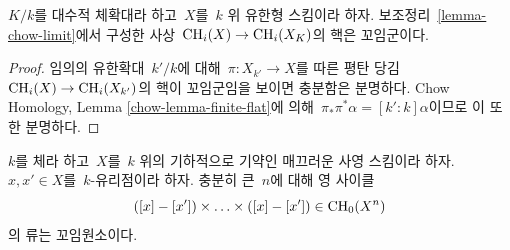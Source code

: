 \begin{lemma}
\label{lemma-kernel-to-closure}
$K/k$를 대수적 체확대라 하고\  $X$를\  $k$ 위 유한형 스킴이라 하자.
보조정리\  \ref{lemma-chow-limit}에서 구성한 사상\ 
$\mathop{\mathrm{CH}}\nolimits_i(X) \to \mathop{\mathrm{CH}}\nolimits_i(X_K)$의 핵은 꼬임군이다.
\end{lemma}

\begin{proof}
임의의 유한확대\  $k'/k$에 대해\  $\pi : X_{k'} \to X$를 따른 평탄 당김\ 
$\mathop{\mathrm{CH}}\nolimits_i(X) \to \mathop{\mathrm{CH}}\nolimits_i(X_{k'})$의 핵이 꼬임군임을 보이면 충분함은
분명하다. Chow Homology, Lemma \ref{chow-lemma-finite-flat}에 의해\ 
$\pi_* \pi^* \alpha = [k' : k] \alpha$이므로 이 또한 분명하다.
\end{proof}

\begin{lemma}[Voevodsky]
\label{lemma-smash-nilpotence}
\begin{reference}
\cite{nilpotence}
\end{reference}
$k$를 체라 하고\  $X$를\  $k$ 위의 기하적으로 기약인 매끄러운 사영
스킴이라 하자. $x, x' \in X$를\  $k$-유리점이라 하자. 충분히 큰\ 
$n$에 대해 영 사이클
$$
([x] - [x']) \times \ldots \times ([x] - [x']) \in
\mathop{\mathrm{CH}}\nolimits_0(X^n)
$$
의 류는 꼬임원소이다.
\end{lemma}

